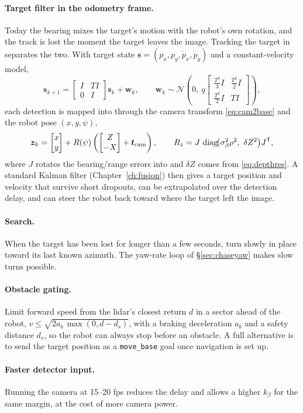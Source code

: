 \paragraph{Target filter in the odometry frame.}
\label{sec:targetkf}
Today the bearing mixes the target's motion with the robot's own rotation,
and the track is lost the moment the target leaves the image. Tracking the
target in  separates the two. With target state
$\bm s=(p_x,p_y,\dot p_x,\dot p_y)$ and a constant-velocity model,
\begin{equation}
\bm s_{k+1}=\begin{bmatrix}I&T I\\0&I\end{bmatrix}\bm s_k+\bm w_k,\qquad
\bm w_k\sim\mathcal N\!\left(0,\ q\begin{bmatrix}\tfrac{T^3}{3}I&\tfrac{T^2}{2}I\\
\tfrac{T^2}{2}I&TI\end{bmatrix}\right),
\end{equation}
each detection is mapped into  through the camera transform
\eqref{eq:cam2base} and the robot pose $(x,y,\psi)$,
\begin{equation}
\bm z_k=\begin{bmatrix}x\\y\end{bmatrix}+R(\psi)\left(
\begin{bmatrix}Z\\-X\end{bmatrix}+\bm t_{\mathrm{cam}}\right),
\qquad
R_z = J\,\operatorname{diag}\!\bigl(\sigma_\beta^2\rho^2,\ \delta Z^2\bigr)J^{\mathsf T},
\end{equation}
where $J$ rotates the bearing/range errors into  and $\delta Z$
comes from \eqref{eq:depthres}. A standard Kalman filter
(Chapter~\ref{ch:fusion}) then gives a target position and velocity that
survive short dropouts, can be extrapolated over the detection delay, and
can steer the robot back toward where the target left the image.

\paragraph{Search.} When the target has been lost for longer than a few
seconds, turn slowly in place toward its last known azimuth. The yaw-rate
loop of \S\ref{sec:chaseyaw} makes slow turns possible.

\paragraph{Obstacle gating.} Limit forward speed from the lidar's closest
return $d$ in a sector ahead of the robot,
$v\le\sqrt{2a_b\,\max(0,d-d_s)}$, with a braking deceleration $a_b$ and a
safety distance $d_s$, so the robot can always stop before an obstacle. A
full alternative is to send the target position as a \texttt{move\_base}
goal once navigation is set up.

\paragraph{Faster detector input.} Running the camera at 15--20 fps
reduces the delay and allows a higher $k_\beta$ for the same margin, at
the cost of more camera power.
